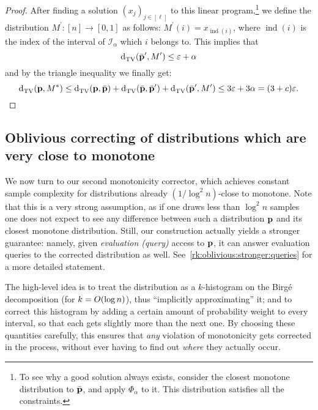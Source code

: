 \begin{proof}
After finding a solution $(x_j)_{j\in[\ell]}$ to this linear program,\footnote{To see why a good solution always exists, consider the closest monotone distribution to $\bar{\mathbf{p}}$, and apply $\Phi_{\alpha}$ to it. This distribution satisfies all the constraints.}  we define the distribution $M^\prime\colon[n]\to [0,1]$ as follows: $M^\prime(i)=x_{\operatorname{ind}(i)}$, where $\operatorname{ind}(i)$ is the index of the interval of $\mathcal{I}_\alpha$ which $i$ belongs to. 
This implies that
\begin{equation*}
{\operatorname{d}_{\rm{TV}}^{}\!\left({\bar{\ensuremath{\mathbf{p}}}^\prime, M^\prime}\right)}\leq \varepsilon+\alpha
\end{equation*}
and by the triangle inequality we finally get:
\[ {\operatorname{d}_{\rm{TV}}^{}\!\left({\mathbf{p}, M^\ast}\right)}\leq {\operatorname{d}_{\rm{TV}}^{}\!\left({\ensuremath{\mathbf{p}}, \bar{\ensuremath{\mathbf{p}}}}\right)}+{\operatorname{d}_{\rm{TV}}^{}\!\left({\bar{\mathbf{p}}, \bar{\mathbf{p}}^\prime}\right)}+{\operatorname{d}_{\rm{TV}}^{}\!\left({\bar{\mathbf{p}}^\prime, M^\prime}\right)}\leq 3\varepsilon+3\alpha = (3+c)\varepsilon. \]
\end{proof}



\subsection{Oblivious correcting of distributions which are very close to monotone}\label{sec:monotonicity:oblivious}


We now turn to our second monotonicity corrector, which achieves constant sample complexity for distributions already $(1/\log^2 n)$-close to monotone. {Note that this is a very strong assumption, as if one draws less than $\log^2 n$ samples one does not expect to see any difference between such a distribution $\mathbf{p}$ and its closest monotone distribution. Still, our construction actually yields a stronger guarantee: namely, given \emph{evaluation (query)} access to $\mathbf{p}$, it can answer evaluation queries to the corrected distribution as well.} See~\cref{rk:oblivious:stronger:queries} for a more detailed statement.

The high-level idea is to treat the distribution as a $k$-histogram on the Birg\'e decomposition (for $k=\bigO{\log n}$), thus ``implicitly approximating'' it; and to correct this histogram by adding a certain amount of probability weight to every interval, so that each gets slightly more than the next one. By choosing these quantities carefully, this ensures that \emph{any} violation of monotonicity gets corrected in the process, without ever having to find out \emph{where} they actually occur.\medskip

